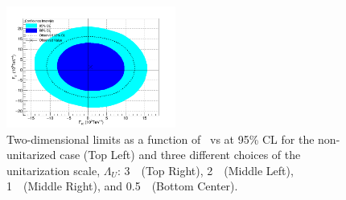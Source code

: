 \begin{figure}[htp]
\includegraphics[width=0.495\textwidth]{figures/aQGC/lll-500.png}
\caption{Two-dimensional limits as a function of \fszero~vs \fsone 
at 95\% CL for the non-unitarized case (Top Left)
and three different choices of the unitarization scale, $\Lambda_U$:
3~\TeV~(Top Right), 2~\TeV~(Middle Left), 1~\TeV~(Middle Right), and 0.5~\TeV~(Bottom Center).}
\label{fig:WWW2D}
\end{figure}  


  

  

  
